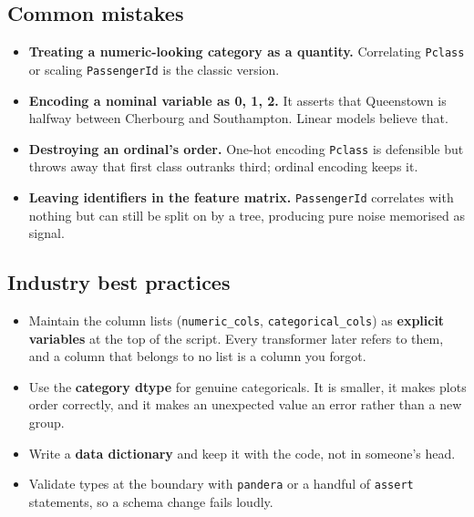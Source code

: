 \documentclass[11pt,a4paper]{article}
\begin{document}

\subsection*{Common mistakes}

\begin{itemize}\itemsep3pt
  \item \textbf{Treating a numeric-looking category as a quantity.} Correlating
        \texttt{Pclass} or scaling \texttt{PassengerId} is the classic version.
  \item \textbf{Encoding a nominal variable as 0, 1, 2.} It asserts that Queenstown is
        halfway between Cherbourg and Southampton. Linear models believe that.
  \item \textbf{Destroying an ordinal's order.} One-hot encoding \texttt{Pclass} is
        defensible but throws away that first class outranks third; ordinal encoding keeps
        it.
  \item \textbf{Leaving identifiers in the feature matrix.} \texttt{PassengerId} correlates
        with nothing but can still be split on by a tree, producing pure noise memorised as
        signal.
\end{itemize}

\subsection*{Industry best practices}

\begin{itemize}\itemsep3pt
  \item Maintain the column lists (\lstinline|numeric_cols|, \lstinline|categorical_cols|)
        as \textbf{explicit variables} at the top of the script. Every transformer later
        refers to them, and a column that belongs to no list is a column you forgot.
  \item Use the \textbf{category dtype} for genuine categoricals. It is smaller, it makes
        plots order correctly, and it makes an unexpected value an error rather than a new
        group.
  \item Write a \textbf{data dictionary} and keep it with the code, not in someone's head.
  \item Validate types at the boundary with \lstinline|pandera| or a handful of
        \lstinline|assert| statements, so a schema change fails loudly.
\end{itemize}
\end{document}
